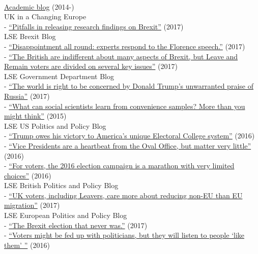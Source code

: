 \documentclass[12pt]{article}
\newcommand{\topic}[1]{\pagebreak[3]\indent {\color{lg}{\footnotesize #1 }}\\}
\newcommand{\entry}[1]{\indent {\color{lg}\guillemotright}\hspace{2pt}#1\vspace{.25em}\\}
\newcommand{\subentry}[1]{{\color{lg}-} #1\vspace{.25em}\\}
\begin{document}
	\topic{Occasional Blogging}
		\entry{\href{http://thomasleeper.com/blog}{Academic blog} (2014-)}
		\entry{UK in a Changing Europe}
			\subentry{\href{http://ukandeu.ac.uk/pitfalls-in-releasing-research-findings-on-brexit/}{``Pitfalls in releasing research findings on Brexit''} (2017)}
		\entry{LSE Brexit Blog}
			\subentry{\href{http://blogs.lse.ac.uk/brexit/2017/09/22/disappointment-all-round-experts-respond-to-the-florence-speech/}{``Disappointment all round: experts respond to the Florence speech.''} (2017)}
            \subentry{\href{http://blogs.lse.ac.uk/brexit/2017/08/13/the-british-are-indifferent-about-many-aspects-of-brexit-but-leave-and-remain-voters-are-divided-on-several-key-issues/}{``The British are indifferent about many aspects of Brexit, but Leave and Remain voters are divided on several key issues''} (2017)}
		\entry{LSE Government Department Blog}
			\subentry{\href{http://blogs.lse.ac.uk/government/2017/01/09/the-world-is-right-to-be-concerned-by-donald-trumps-unwarranted-praise-of-russia/}{``The world is right to be concerned by Donald Trump's unwarranted praise of Russia''} (2017)}
			\subentry{\href{http://blogs.lse.ac.uk/government/2016/01/14/what-can-social-scientists-learn-from-convenience-samples-more-than-you-might-think/}{``What can social scientists learn from convenience samples? More than you might think''} (2015)}
		\entry{LSE US Politics and Policy Blog}
			\subentry{\href{http://blogs.lse.ac.uk/usappblog/2016/11/10/trump-owes-his-victory-to-americas-unique-electoral-college-system/}{``Trump owes his victory to America's unique Electoral College system''} (2016)}
			\subentry{\href{http://blogs.lse.ac.uk/usappblog/2016/10/05/vice-presidents-are-a-heartbeat-from-the-oval-office-but-matter-very-little/}{``Vice Presidents are a heartbeat from the Oval Office, but matter very little''} (2016)}
			\subentry{\href{http://blogs.lse.ac.uk/usappblog/2016/09/23/for-voters-the-2016-election-campaign-is-a-marathon-with-very-limited-choices/}{``For voters, the 2016 election campaign is a marathon with very limited choices''} (2016)}
		\entry{LSE British Politics and Policy Blog}
			\subentry{\href{http://blogs.lse.ac.uk/politicsandpolicy/non-eu-migration-is-what-uk-voters-care-most-about/}{``UK voters, including Leavers, care more about reducing non-EU than EU migration''} (2017)}
        \entry{LSE European Politics and Policy Blog}
			\subentry{\href{http://blogs.lse.ac.uk/europpblog/2017/06/07/uk-general-election-preview-what-to-look-out-for-as-britain-goes-to-the-polls/}{``The Brexit election that never was.''} (2017)}
            \subentry{\href{http://blogs.lse.ac.uk/europpblog/2016/06/23/voters-listen-people-like-them/}{``Voters might be fed up with politicians, but they will listen to people `like them' ''} (2016)}
\end{document}
